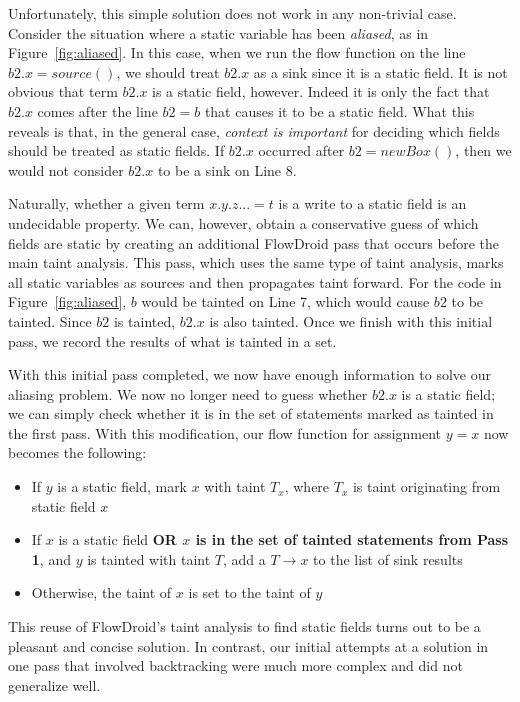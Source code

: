 Unfortunately, this simple solution does not work in any non-trivial case. Consider the situation where a static variable has been \emph{aliased}, as in Figure~\ref{fig:aliased}. In this case, when we run the flow function on the line $\mathit{b2}.x = source()$, we should treat $\mathit{b2}.x$ as a sink since it is a static field. It is not obvious that term $\mathit{b2}.x$ is a static field, however. Indeed it is only the fact that $\mathit{b2}.x$ comes after the line $\mathit{b2} = b$ that causes it to be a static field. What this reveals is that, in the general case, \emph{context is important} for deciding which fields should be treated as static fields. If $\mathit{b2}.x$ occurred after $\mathit{b2} = new Box()$, then we would not consider $\mathit{b2}.x$ to be a sink on Line 8.

Naturally, whether a given term $x.y.z... = t$ is a write to a static field is an undecidable property. We can, however, obtain a conservative guess of which fields are static by creating an additional FlowDroid pass that occurs before the main taint analysis. This pass, which uses the same type of taint analysis, marks all static variables as sources and then propagates taint forward. For the code in Figure~\ref{fig:aliased}, $b$ would be tainted on Line 7, which would cause $\mathit{b2}$ to be tainted. Since $\mathit{b2}$ is tainted, $\mathit{b2}.x$ is also tainted. Once we finish with this initial pass, we record the results of what is tainted in a set.

With this initial pass completed, we now have enough information to solve our aliasing problem. We now no longer need to guess whether $\mathit{b2}.x$ is a static field; we can simply check whether it is in the set of statements marked as tainted in the first pass. With this modification, our flow function for assignment $y = x$ now becomes the following:

\begin{itemize}
\item If $y$ is a static field, mark $x$ with taint $T_x$, where $T_x$ is taint originating from static field $x$
\item If $x$ is a static field \textbf{OR $x$ is in the set of tainted statements from Pass 1}, and $y$ is tainted with taint $T$, add a $T\rightarrow x$ to the list of sink results
\item Otherwise, the taint of $x$ is set to the taint of $y$
\end{itemize}

This reuse of FlowDroid's taint analysis to find static fields turns out to be a pleasant and concise solution. In contrast, our initial attempts at a solution in one pass that involved backtracking were much more complex and did not generalize well.

